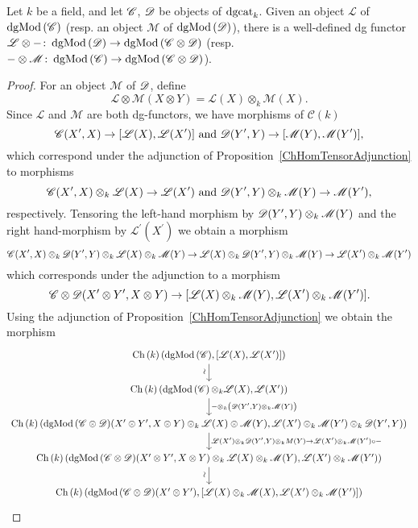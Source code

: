\documentclass[dissertation.tex]{subfiles}
\begin{document}
\begin{lem}
  Let $k$ be a field, and let $\mathscr{C}$, $\mathscr{D}$ be objects of $\operatorname{dgcat}_k$.
  Given an object $\mathscr{L}$ of $\operatorname{dgMod\left(\mathscr{C}\right)}$ (resp. an object $\mathscr{M}$ of $\operatorname{dgMod\left(\mathscr{D}\right)}$), there is a well-defined dg functor $\mathscr{L} \otimes - \colon \operatorname{dgMod\left(\mathscr{D}\right)} \to \operatorname{dgMod\left(\mathscr{C} \otimes \mathscr{D}\right)}$ (resp. $- \otimes \mathscr{M} \colon \operatorname{dgMod\left(\mathscr{C}\right)} \to \operatorname{dgMod\left(\mathscr{C} \otimes \mathscr{D}\right)}$).
  

  \begin{proof}
    For an object $\mathscr{M}$ of $\mathscr{D}$, define 
    $$\mathscr{L} \otimes \mathscr{M}(X \otimes Y) = \mathscr{L}(X) \otimes_k \mathscr{M}(X).$$
    Since $\mathscr{L}$ and $\mathscr{M}$ are both dg-functors, we have morphisms of $\mathcal{C}(k)$
    $$\mathscr{C}(X^\prime, X) \to [\mathscr{L}(X), \mathscr{L}(X^\prime)]\ \text{and}\ \mathscr{D}(Y^\prime, Y) \to [\mathscr{M}(Y), \mathscr{M}(Y^\prime)],$$
    which correspond under the adjunction of Proposition~\ref{ChHomTensorAdjunction} to morphisms
    $$\CC(X^\prime, X) \otimes_k \mathscr{L}(X) \to \mathscr{L}(X^\prime)
    \ \text{and}\ 
    \D(Y^\prime, Y) \otimes_k \mathscr{M}(Y) \to \mathscr{M}(Y^\prime),$$
    respectively.
    Tensoring the left-hand morphism by $\mathscr{D}(Y^\prime,Y) \otimes_k \mathscr{M}(Y)$ and the right hand-morphism by $\mathscr{L^\prime}(X^\prime)$ we obtain a morphism
    $$\mathscr{C}(X^\prime, X) \otimes_k \mathscr{D}(Y^\prime, Y) \otimes_k \mathscr{L}(X) \otimes_k \mathscr{M}(Y) \to 
    \mathscr{L}(X) \otimes_k \mathscr{D}(Y^\prime,Y) \otimes_k \mathscr{M}(Y) \to
    \mathscr{L}(X^\prime) \otimes_k \mathscr{M}(Y^\prime)$$
    which corresponds under the adjunction to a morphism
    $$\mathscr{C} \otimes \mathscr{D}(X^\prime \otimes Y^\prime, X \otimes Y) \to
    [\mathscr{L}(X) \otimes_k \mathscr{M}(Y), \mathscr{L}(X^\prime) \otimes_k \mathscr{M}(Y^\prime)].$$
    Using the adjunction of Proposition~\ref{ChHomTensorAdjunction} we obtain the morphism
    $$\begin{tikzcd}
      \Ch{k}(\cdg{\CC}, [\funct{L}(X), \funct{L}(X^\prime)]) \arrow{d}[rotate=90,xshift=-1ex,yshift=1ex]{\sim}\\
      \Ch{k}(\cdg{\CC} \otimes_k \funct{L}(X), \funct{L}(X^\prime))\arrow{d}{- \otimes_k \left(\D(Y^\prime, Y) \otimes_k \funct{M}(Y)\right)}\\
      \Ch{k}(\cdg{\CC \otimes \D}(X^\prime \otimes Y^\prime, X \otimes Y) \otimes_k \funct{L}(X) \otimes \funct{M}(Y), \funct{L}(X^\prime) \otimes_k \funct{M}(Y^\prime) \otimes_k \D(Y^\prime, Y))
      \arrow{d}{\funct{L}(X^\prime) \otimes_k \D(Y^\prime,Y) \otimes_k M(Y) \to \funct{L}(X^\prime) \otimes_k \funct{M}(Y^\prime) \circ -}\\
      \Ch{k}(\cdg{\CC \otimes \D}(X^\prime \otimes Y^\prime, X \otimes Y) \otimes_k \funct{L}(X) \otimes_k \funct{M}(Y), \funct{L}(X^\prime) \otimes_k \funct{M}(Y^\prime))\arrow{d}[rotate=90,xshift=-1ex,yshift=1ex]{\sim}\\
      \Ch{k}(\cdg{\CC \otimes \D}(X^\prime \otimes Y^\prime), [\funct{L}(X) \otimes_k \funct{M}(X), \funct{L}(X^\prime) \otimes_k \funct{M}(Y^\prime)])
    \end{tikzcd}$$
  \end{proof}
\end{lem}
\end{document}
